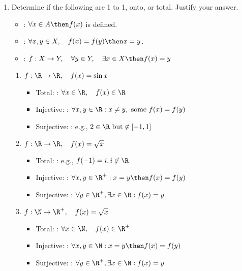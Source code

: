\documentclass[basic, header]{nosvagor-notes}
\begin{document}
\begin{enumerate}[itemsep=5em]
  \item Determine if the following are 1 to 1, onto, or total. Justify your answer.

    \begin{itemize}
      \item {}: \(\forall x \in A \then f(x) \) is defined.

      \item {}:
        \(\forall x,y \in X, \quad f(x) = f(y) \then x = y\).

      \item {}:
         \(f : X \to Y, \quad \forall y \in Y, \quad \exists x
        \in X \then f(x) = y \)
    \end{itemize}

    \vspace{1em}

  \begin{enumerate}
    \item \(f : \R \to \R, \quad f(x) = \sin x\)
      \begin{itemize}
        \item Total: : \(\forall x \in \R, \quad  f(x) \in \R\)
        \item Injective: : \(\forall x, y \in \R : x \neq y, ~\text{some}~ f(x) = f(y)\)
        \item Surjective: : e.g., \( 2 \in \R ~\text{but}\not\in [-1,1]\)
      \end{itemize}

    \item \(f : \R \to \R, \quad f(x) = \sqrt{x}\)
      \begin{itemize}
        \item Total: : e.g., \(f(-1) = i, i \not\in \R\)
        \item Injective: : \(\forall x,y \in \R^+ : x = y \then f(x) = f(y)\)
        \item Surjective: : \(\forall y \in \R^+, \exists x \in \R : f(x) = y\)
      \end{itemize}

    \item \(f : \N \to \R^+, \quad f(x) = \sqrt{x}\)
      \begin{itemize}
        \item Total: : \(\forall x \in \N, \quad  f(x) \in \R^+ \)
        \item Injective: : \(\forall x, y \in \N : x = y \then f(x) = f(y)  \)
        \item Surjective: : \(\forall y \in \R^+, \exists x \in \N : f(x) = y\)
      \end{itemize}


\end{enumerate}
\end{enumerate}
\end{document}
